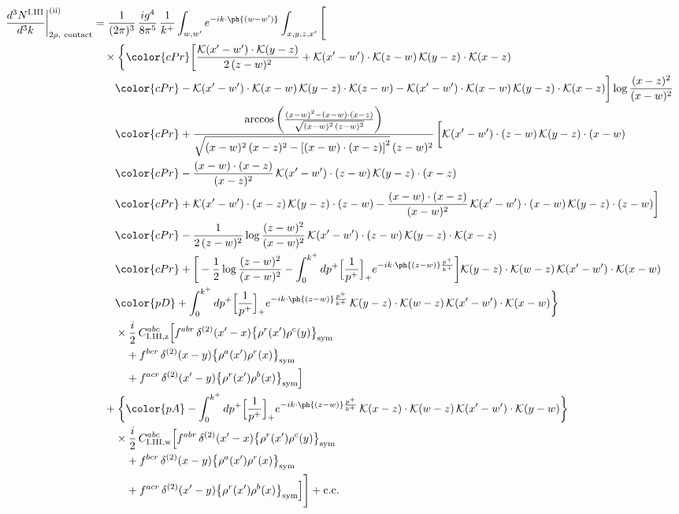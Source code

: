 \begin{align}
\frac{d^{3}N^{\rm I.III}}{d^{3}k}\bigg|^{\rm (ii)}_{2\rho,\ {\rm contact}}&=\frac{1}{(2\pi)^{3}}\,\frac{ig^{4}}{8\pi^{5}}\,\frac{1}{k^{+}}\int_{w,w'}e^{-ik\cdot\ph{(w-w')}}\int_{x,y,z,x'}\Bigg[\notag\\
&\quad\times\bigg\{{\color{cPr}\bigg[\frac{\mathcal{K}(x'-w')\cdot\mathcal{K}(y-z)}{2\,(z-w)^{2}}+\mathcal{K}(x'-w')\cdot\mathcal{K}(z-w)\,\mathcal{K}(y-z)\cdot\mathcal{K}(x-z)}\notag\\
&\qquad{\color{cPr}-\mathcal{K}(x'-w')\cdot\mathcal{K}(x-w)\,\mathcal{K}(y-z)\cdot\mathcal{K}(z-w)-\mathcal{K}(x'-w')\cdot\mathcal{K}(x-w)\,\mathcal{K}(y-z)\cdot\mathcal{K}(x-z)\bigg]\log\frac{(x-z)^{2}}{(x-w)^{2}}}\notag\\
&\qquad{\color{cPr}+\frac{\arccos\left(\frac{(x-w)^{2}-(x-w)\cdot (x-z)}{\sqrt{(x-w)^{2}\,(z-w)^{2}}}\right)}{\sqrt{(x-w)^{2}\,(x-z)^{2}-\left[(x-w)\cdot (x-z)\right]^{2}}\,(z-w)^{2}}\,\bigg[\mathcal{K}(x'-w')\cdot(z-w)\,\mathcal{K}(y-z)\cdot(x-w)}\notag\\
&\qquad{\color{cPr}-\frac{(x-w)\cdot(x-z)}{(x-z)^{2}}\,\mathcal{K}(x'-w')\cdot(z-w)\,\mathcal{K}(y-z)\cdot(x-z)}\notag\\
&\qquad{\color{cPr}+\mathcal{K}(x'-w')\cdot(x-z)\,\mathcal{K}(y-z)\cdot(z-w)-\frac{(x-w)\cdot(x-z)}{(x-w)^{2}}\,\mathcal{K}(x'-w')\cdot(x-w)\,\mathcal{K}(y-z)\cdot(z-w)\bigg]}\notag\\
&\qquad{\color{cPr}-\frac{1}{2\,(z-w)^{2}}\log\frac{(z-w)^{2}}{(x-w)^{2}}\,\mathcal{K}(x'-w')\cdot(z-w)\,\mathcal{K}(y-z)\cdot\mathcal{K}(x-z)}\notag\\
&\qquad{\color{cPr}+\bigg[-\frac{1}{2}\log\frac{(z-w)^{2}}{(x-w)^{2}}-\int_{0}^{k^{+}}dp^{+}\Big[\frac{1}{p^{+}}\Big]_{+}e^{-ik\cdot\ph{(z-w)}\frac{p^{+}}{k^{+}}}\bigg]\mathcal{K}(y-z)\cdot\mathcal{K}(w-z)\,\mathcal{K}(x'-w')\cdot\mathcal{K}(x-w)}\notag\\
&\qquad{\color{pD}+\int_{0}^{k^{+}}dp^{+}\Big[\frac{1}{p^{+}}\Big]_{+}e^{-ik\cdot\ph{(z-w)}\frac{p^{+}}{k^{+}}}\,\mathcal{K}(y-z)\cdot\mathcal{K}(w-z)\,\mathcal{K}(x'-w')\cdot\mathcal{K}(x-w)}\bigg\}\notag\\
&\qquad\times \frac{i}{2}\,C^{abc}_{{\rm I.III,z}}\Big[f^{abr}\,\delta^{(2)}(x'-x)\big\{\rho^{r}(x')\rho^{c}(y)\big\}_{\rm sym}\notag\\
&\qquad\quad +f^{bcr}\,\delta^{(2)}(x-y)\big\{\rho^{a}(x')\rho^{r}(x)\big\}_{\rm sym}\notag\\
&\qquad\quad +f^{acr}\,\delta^{(2)}(x'-y)\big\{\rho^{r}(x')\rho^{b}(x)\big\}_{\rm sym}\Big]\notag\\
&\quad+\bigg\{{\color{pA}-\int_{0}^{k^{+}}dp^{+}\Big[\frac{1}{p^{+}}\Big]_{+}e^{-ik\cdot\ph{(z-w)}\frac{p^{+}}{k^{+}}}\,\mathcal{K}(x-z)\cdot\mathcal{K}(w-z)\,\mathcal{K}(x'-w')\cdot\mathcal{K}(y-w)}\bigg\}\notag\\
&\qquad\times \frac{i}{2}\,C^{abc}_{{\rm I.III,w}}\Big[f^{abr}\,\delta^{(2)}(x'-x)\big\{\rho^{r}(x')\rho^{c}(y)\big\}_{\rm sym}\notag\\
&\qquad\quad +f^{bcr}\,\delta^{(2)}(x-y)\big\{\rho^{a}(x')\rho^{r}(x)\big\}_{\rm sym}\notag\\
&\qquad\quad +f^{acr}\,\delta^{(2)}(x'-y)\big\{\rho^{r}(x')\rho^{b}(x)\big\}_{\rm sym}\Big]\Bigg]+{\rm c.c.}\label{eq:D-I.III-2}
\end{align}
